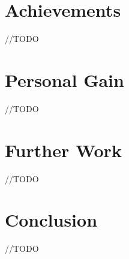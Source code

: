 \documentclass[12pt,twoside,a4paper]{report}
\begin{document}
\section{Achievements}\label{6.2}
//TODO

\section{Personal Gain}\label{6.3}
//TODO

\section{Further Work}\label{6.4}
//TODO

\section{Conclusion}\label{6.5}
//TODO
\end{document}

